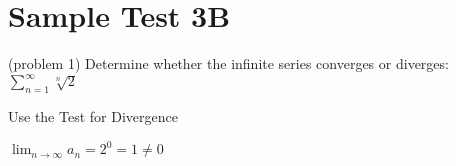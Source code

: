 \documentclass[handout]{ximera}
\begin{document}
\section{Sample Test 3B}














\begin{problem}(problem 1)
Determine whether the infinite series converges or diverges: 
$\displaystyle \sum_{n=1}^\infty \sqrt[n] 2$

\begin{hint}
Use the Test for Divergence
\end{hint}

\begin{hint}
$\displaystyle \lim_{n \to \infty} a_n = 2^0 = 1 \neq 0$
\end{hint}

\end{problem}
\end{document}
